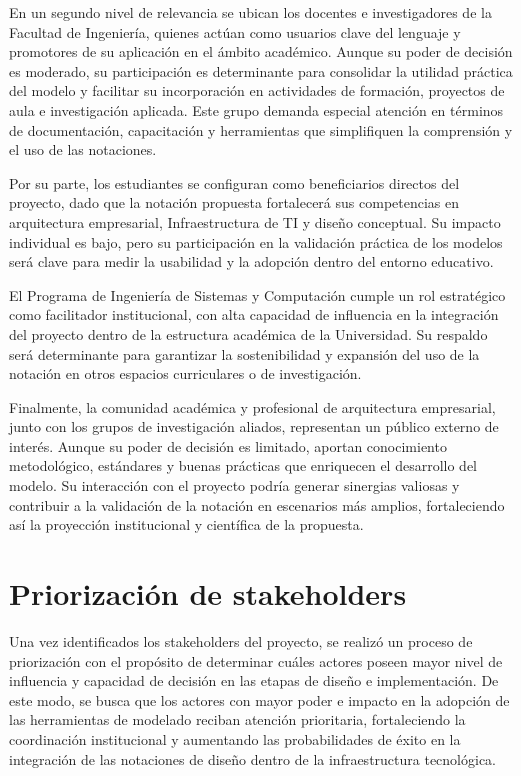 En un segundo nivel de relevancia se ubican los docentes e investigadores de la Facultad de Ingeniería, quienes actúan como usuarios clave del lenguaje y promotores de su aplicación en el ámbito académico. Aunque su poder de decisión es moderado, su participación es determinante para consolidar la utilidad práctica del modelo y facilitar su incorporación en actividades de formación, proyectos de aula e investigación aplicada. Este grupo demanda especial atención en términos de documentación, capacitación y herramientas que simplifiquen la comprensión y el uso de las notaciones.

Por su parte, los estudiantes se configuran como beneficiarios directos del proyecto, dado que la notación propuesta fortalecerá sus competencias en arquitectura empresarial, Infraestructura de TI y diseño conceptual. Su impacto individual es bajo, pero su participación en la validación práctica de los modelos será clave para medir la usabilidad y la adopción dentro del entorno educativo.

El Programa de Ingeniería de Sistemas y Computación cumple un rol estratégico como facilitador institucional, con alta capacidad de influencia en la integración del proyecto dentro de la estructura académica de la Universidad. Su respaldo será determinante para garantizar la sostenibilidad y expansión del uso de la notación en otros espacios curriculares o de investigación.

Finalmente, la comunidad académica y profesional de arquitectura empresarial, junto con los grupos de investigación aliados, representan un público externo de interés. Aunque su poder de decisión es limitado, aportan conocimiento metodológico, estándares y buenas prácticas que enriquecen el desarrollo del modelo. Su interacción con el proyecto podría generar sinergias valiosas y contribuir a la validación de la notación en escenarios más amplios, fortaleciendo así la proyección institucional y científica de la propuesta.



\section{Priorización de stakeholders}
Una vez identificados los stakeholders del proyecto, se realizó un proceso de priorización con el propósito de determinar cuáles actores poseen mayor nivel de influencia y capacidad de decisión en las etapas de diseño e implementación. De este modo, se busca que los actores con mayor poder e impacto en la adopción de las herramientas de modelado reciban atención prioritaria, fortaleciendo la coordinación institucional y aumentando las probabilidades de éxito en la integración de las notaciones de diseño dentro de la infraestructura tecnológica.

